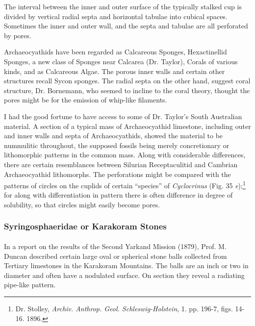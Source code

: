 \documentclass[a4paper, 12pt, oneside]{article}
\begin{document}
The interval between the inner and outer surface of the typically stalked cup is divided by vertical radial septa and horizontal tabulae into cubical spaces. Sometimes the inner and outer wall, and the septa and tabulae are all perforated by pores.

Archaeocyathids have been regarded as Calcareous Sponges, Hexactinellid Sponges, a new class of Sponges near Calcarea (Dr. Taylor), Corals of various kinds, and as Calcareous Algae. The porous inner walls and certain other structures recall Sycon sponges. The radial septa on the other hand, suggest coral structure, Dr. Bornemann, who seemed to incline to the coral theory, thought the pores might be for the emission of whip-like filaments.

I had the good fortune to have access to some of Dr. Taylor's South Australian material. A section of a typical mass of Archaeocyathid limestone, including outer and inner walls and septa of Archaeocyathids, showed the material to be nummulitic throughout, the supposed fossils being merely concretionary or lithomorphic patterns in the common mass. Along with considerable differences, there are certain resemblances between Silurian Receptaculitid and Cambrian Archaeocyathid lithomorphs. The perforations might be compared with the patterns of circles on the cuplids of certain ``species'' of \emph{Cyclocrinus} (Fig. 35 \emph{e});\footnote{Dr. Stolley, \emph{Archiv. Anthrop. Geol. Schleswig-Holstein}, 1. pp. 196-7, figs. 14-16. 1896.} for along with differentiation in pattern there is often difference in degree of solubility, so that circles might easily become pores.

\subsubsection{Syringosphaeridae or Karakoram Stones}
\paragraph{}
In a report on the results of the Second Yarkand Mission (1879), Prof. M. Duncan described certain large oval or spherical stone balls collected from Tertiary limestones in the Karakoram Mountains. The balls are an inch or two in diameter and often have a nodulated surface. On section they reveal a radiating pipe-like pattern.
\end{document}
